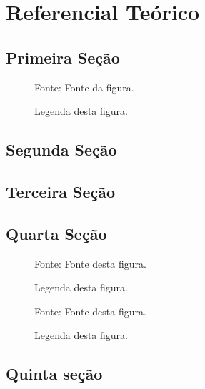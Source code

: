 \chapter{Referencial Teórico}

\section{Primeira Seção}
\lipsum[1-4]

	\begin{figure}[!ht]
		\centering
		\fbox{\rule[5cm]{\textwidth}{0cm}}
		\caption{Legenda desta figura.}
		\begin{minipage}{\textwidth}
			\centering
			{\small Fonte: Fonte da figura.}\par
		\end{minipage}
		\label{fig:irradiacao}
	\end{figure}
	
\section{Segunda Seção}
\lipsum[5-8]

\section{Terceira Seção}
\lipsum[9-10]
	
\section{Quarta Seção}
\lipsum[11]
	
	\begin{figure}[!ht]
		\centering
		\fbox{\rule[6cm]{\textwidth}{0cm}}
		\caption{Legenda desta figura.}
		\begin{minipage}{\textwidth}
			\centering
			{\small Fonte: Fonte desta figura.}\par
		\end{minipage}
		\label{fig:aquecedor1}
	\end{figure}
	
\lipsum[12]
	
	\begin{figure}[!ht]
		\centering
		\fbox{\rule[5cm]{\textwidth}{0cm}}
		\caption{Legenda desta figura.}
		\begin{minipage}{\textwidth}
			\centering
			{\small Fonte: Fonte desta figura.}\par
		\end{minipage}
		\label{fig:aquecedor2}
	\end{figure}
	
\lipsum[13]
	
\section{Quinta seção}
\lipsum[14-17]